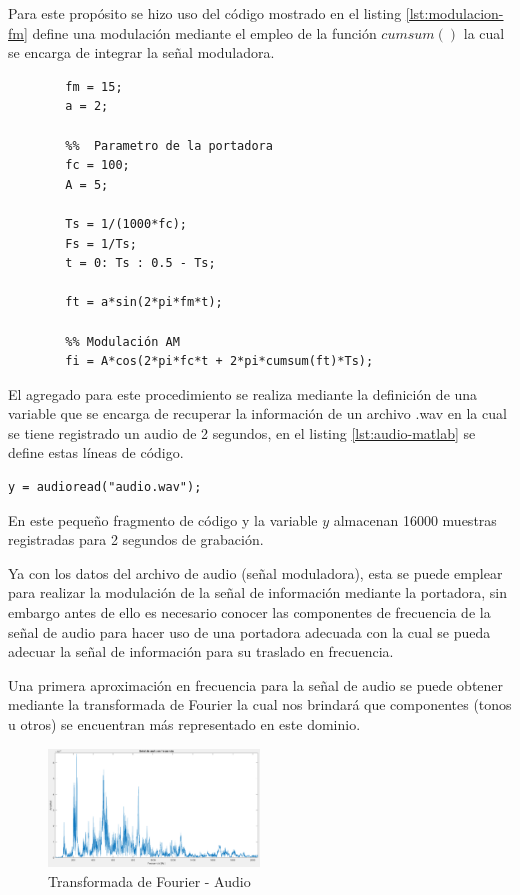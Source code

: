 \documentclass[conference]{IEEEtran}
\begin{document}
	Para este propósito se hizo uso del código mostrado en el listing \ref{lst:modulacion-fm} define una modulación mediante el empleo de la función $cumsum()$ la cual se encarga de integrar la señal moduladora.
	
	\begin{lstlisting}[numbers=none, caption="", label=lst:modulacion-fm]
		%% Parámetros de la senal de informacion
		fm = 15;
		a = 2;
		
		%%  Parametro de la portadora
		fc = 100;
		A = 5;
		
		Ts = 1/(1000*fc);
		Fs = 1/Ts;
		t = 0: Ts : 0.5 - Ts;
		
		ft = a*sin(2*pi*fm*t);
		
		%% Modulación AM
		fi = A*cos(2*pi*fc*t + 2*pi*cumsum(ft)*Ts);
	\end{lstlisting}
	
	El agregado para este procedimiento se realiza mediante la definición de una variable que se encarga de recuperar la información de un archivo .wav en la cual se tiene registrado un audio de 2 segundos, en el listing \ref{lst:audio-matlab} se define estas líneas de código.
	
	\begin{lstlisting}[caption={Recuperación del archivo del audio}, numbers=none, label=lst:audio-matlab]
		y = audioread("audio.wav");
	\end{lstlisting}
	
	En este pequeño fragmento de código y la variable $y$ almacenan 16000 muestras registradas para 2 segundos de grabación.
	
	Ya con los datos del archivo de audio (señal moduladora), esta se puede emplear para realizar la modulación de la señal de información mediante la portadora, sin embargo antes de ello es necesario conocer las componentes de frecuencia de la señal de audio para hacer uso de una portadora adecuada con la cual se pueda adecuar la señal de información para su traslado en frecuencia.
	
	Una primera aproximación en frecuencia para la señal de audio se puede obtener mediante la transformada de Fourier la cual nos brindará que componentes (tonos u otros) se encuentran más representado en este dominio.
	
	\begin{figure}[h]
		\centering
		\includegraphics[width=0.5\textwidth]{media/fft-audio}
		\caption{Transformada de Fourier - Audio}
		\label{fig:fft-audio}
	\end{figure}
	
\end{document}
